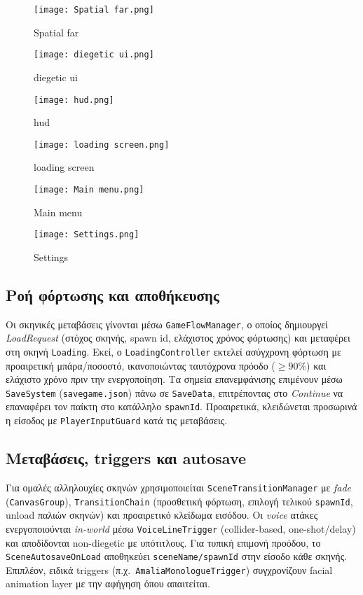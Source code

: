 \begin{figure}[H]
    \centering
    \texttt{[image: Spatial far.png]}
    \caption{Spatial far}
    \label{fig:placeholder}
\end{figure}
\begin{figure}[H]
    \centering
    \texttt{[image: diegetic ui.png]}
    \caption{diegetic ui}
    \label{fig:placeholder}
\end{figure}
\begin{figure}[H]
    \centering
    \texttt{[image: hud.png]}
    \caption{hud}
    \label{fig:placeholder}
\end{figure}
\begin{figure}[H]
    \centering
    \texttt{[image: loading screen.png]}
    \caption{loading screen}
    \label{fig:placeholder}
\end{figure}
\begin{figure}[H]
    \centering
    \texttt{[image: Main menu.png]}
    \caption{Main menu}
    \label{fig:placeholder}
\end{figure}
\begin{figure}[H]
    \centering
    \texttt{[image: Settings.png]}
    \caption{Settings}
    \label{fig:placeholder}
\end{figure}
\subsection{Ροή φόρτωσης και αποθήκευσης}
Οι σκηνικές μεταβάσεις γίνονται μέσω \texttt{GameFlowManager}, ο οποίος δημιουργεί \textit{LoadRequest} (στόχος σκηνής, spawn id, ελάχιστος χρόνος φόρτωσης) και μεταφέρει στη σκηνή \texttt{Loading}. Εκεί, ο \texttt{LoadingController} εκτελεί ασύγχρονη φόρτωση με προαιρετική μπάρα/ποσοστό, ικανοποιώντας ταυτόχρονα πρόοδο (\(\geq 90\%\)) και ελάχιστο χρόνο πριν την ενεργοποίηση. Τα σημεία επανεμφάνισης επιμένουν μέσω \texttt{SaveSystem} (\texttt{savegame.json}) πάνω σε \texttt{SaveData}, επιτρέποντας στο \textit{Continue} να επαναφέρει τον παίκτη στο κατάλληλο \texttt{spawnId}. Προαιρετικά, κλειδώνεται προσωρινά η είσοδος με \texttt{PlayerInputGuard} κατά τις μεταβάσεις. 

\subsection{Μεταβάσεις, triggers και autosave}
Για ομαλές αλληλουχίες σκηνών χρησιμοποιείται \texttt{SceneTransitionManager} με \textit{fade} (\texttt{CanvasGroup}), \texttt{TransitionChain} (προσθετική φόρτωση, επιλογή τελικού \texttt{spawnId}, unload παλιών σκηνών) και προαιρετικό κλείδωμα εισόδου. 
Οι \textit{voice} ατάκες ενεργοποιούνται \textit{in-world} μέσω \texttt{VoiceLineTrigger} (collider-based, one-shot/delay) και αποδίδονται non-diegetic με υπότιτλους.
Για τυπική επιμονή προόδου, το \texttt{SceneAutosaveOnLoad} αποθηκεύει \texttt{sceneName/spawnId} στην είσοδο κάθε σκηνής. Επιπλέον, ειδικά triggers (π.χ.\ \texttt{AmaliaMonologueTrigger}) συγχρονίζουν facial animation layer με την αφήγηση όπου απαιτείται. 

